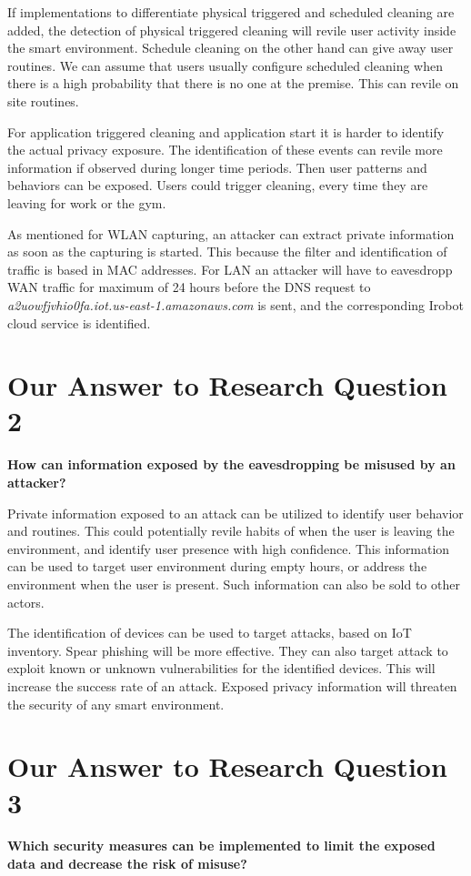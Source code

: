 If implementations to differentiate physical triggered and scheduled cleaning are added, the detection of physical triggered cleaning will revile user activity inside the smart environment. Schedule cleaning on the other hand can give away user routines. We can assume that users usually configure scheduled cleaning when there is a high probability that there is no one at the premise. This can revile on site routines. 

For application triggered cleaning and application start it is harder to identify the actual privacy exposure. The identification of these events can revile more information if observed during longer time periods. Then user patterns and behaviors can be exposed. Users could trigger cleaning,  every time they are leaving for work or the gym.

As mentioned for WLAN capturing, an attacker can extract private information as soon as the capturing is started. This because the filter and identification of traffic is based in MAC addresses. For LAN an attacker will have to eavesdropp WAN traffic for maximum of 24 hours before the DNS request to \textit{a2uowfjvhio0fa.iot.us-east-1.amazonaws.com} is sent, and the corresponding Irobot cloud service is identified. 

\section{Our Answer to Research Question  2}
\textbf{How can information exposed by the eavesdropping be misused by an attacker?} 

Private information exposed to an attack can be utilized to identify user behavior and routines. This could potentially revile habits of when the user is leaving the environment, and identify user presence with high confidence. This information can be used to target user environment during empty hours, or address the environment when the user is present. Such information can also be sold to other actors. 

The identification of devices can be used  to target attacks, based on IoT inventory. Spear phishing \cite{spear_phishing} will be more effective. They can also target attack to exploit known or unknown vulnerabilities for the identified devices. This will increase the success rate of an attack. Exposed privacy information will threaten the security of any smart environment. 

\section{Our Answer to Research Question  3}
\textbf{Which security measures can be implemented to limit the exposed data and decrease the risk of misuse?} 

